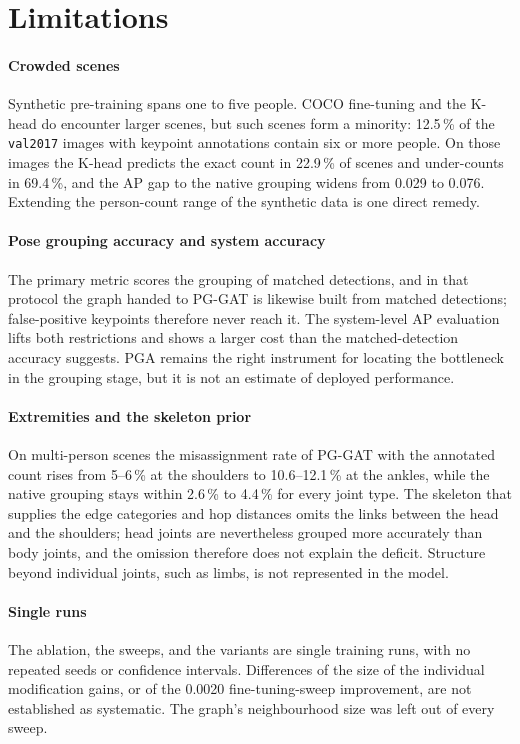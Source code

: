 \section{Limitations}
\label{sec:limitations}

\paragraph{Crowded scenes}
Synthetic pre-training spans one to five people.
COCO fine-tuning and the K-head do encounter larger scenes, but such scenes form a minority:
12.5\,\% of the \texttt{val2017} images with keypoint annotations contain six or more people.
On those images the K-head predicts the exact count in 22.9\,\% of scenes
and under-counts in 69.4\,\%, and the AP gap to the native grouping widens from 0.029 to 0.076.
Extending the person-count range of the synthetic data is one direct remedy.

\paragraph{Pose grouping accuracy and system accuracy}
The primary metric scores the grouping of matched detections,
and in that protocol the graph handed to PG-GAT is likewise built from matched detections;
false-positive keypoints therefore never reach it.
The system-level AP evaluation lifts both restrictions
and shows a larger cost than the matched-detection accuracy suggests.
PGA remains the right instrument for locating the bottleneck in the grouping stage,
but it is not an estimate of deployed performance.

\paragraph{Extremities and the skeleton prior}
On multi-person scenes the misassignment rate of PG-GAT with the annotated count rises from 5--6\,\% at the shoulders to 10.6--12.1\,\% at the ankles,
while the native grouping stays within 2.6\,\% to 4.4\,\% for every joint type.
The skeleton that supplies the edge categories and hop distances omits the links between the head and the shoulders;
head joints are nevertheless grouped more accurately than body joints,
and the omission therefore does not explain the deficit.
Structure beyond individual joints, such as limbs, is not represented in the model.

\paragraph{Single runs}
The ablation, the sweeps, and the variants are single training runs,
with no repeated seeds or confidence intervals.
Differences of the size of the individual modification gains, or of the 0.0020 fine-tuning-sweep improvement,
are not established as systematic.
The graph's neighbourhood size was left out of every sweep.

